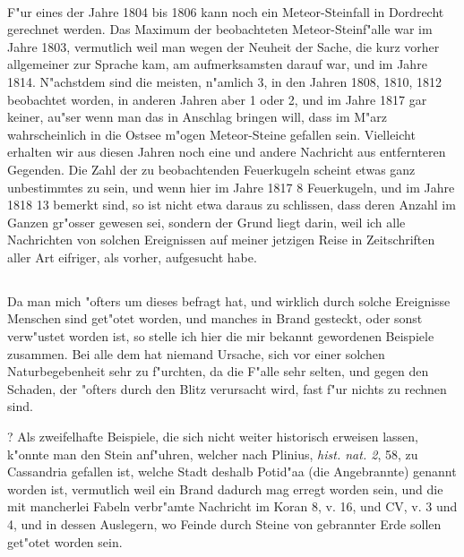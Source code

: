 \documentclass[a4paper, 11pt, oneside, polutonikogreek, german]{article}
\begin{document}
\paragraph{}
F"ur eines der Jahre 1804 bis 1806 kann noch ein Meteor-Steinfall in Dordrecht gerechnet werden. Das Maximum der beobachteten Meteor-Steinf"alle war im Jahre 1803, vermutlich weil man wegen der Neuheit der Sache, die kurz vorher allgemeiner zur Sprache kam, am aufmerksamsten darauf war, und im Jahre 1814. N"achstdem sind die meisten, n"amlich 3, in den Jahren 1808, 1810, 1812 beobachtet worden, in anderen Jahren aber 1 oder 2, und im Jahre 1817 gar keiner, au"ser wenn man das in Anschlag bringen will, dass im M"arz wahrscheinlich in die Ostsee m"ogen Meteor-Steine gefallen sein. Vielleicht erhalten wir aus diesen Jahren noch eine und andere Nachricht aus entfernteren Gegenden. Die Zahl der zu beobachtenden Feuerkugeln scheint etwas ganz unbestimmtes zu sein, und wenn hier im Jahre 1817 8 Feuerkugeln, und im Jahre 1818 13 bemerkt sind, so ist nicht etwa daraus zu schlissen, dass deren Anzahl im Ganzen gr"osser gewesen sei, sondern der Grund liegt darin, weil ich alle Nachrichten von solchen Ereignissen auf meiner jetzigen Reise in Zeitschriften aller Art eifriger, als vorher, aufgesucht habe.
\subsection{}
\paragraph{}
Da man mich "ofters um dieses befragt hat, und wirklich durch solche Ereignisse Menschen sind get"otet worden, und manches in Brand gesteckt, oder sonst verw"ustet worden ist, so stelle ich hier die mir bekannt gewordenen Beispiele zusammen. Bei alle dem hat niemand Ursache, sich vor einer solchen Naturbegebenheit sehr zu f"urchten, da die F"alle sehr selten, und gegen den Schaden, der "ofters durch den Blitz verursacht wird, fast f"ur nichts zu rechnen sind.

? Als zweifelhafte Beispiele, die sich nicht weiter historisch erweisen lassen, k"onnte man den Stein anf"uhren, welcher nach Plinius, \emph{hist. nat. 2}, 58, zu Cassandria gefallen ist, welche Stadt deshalb Potid"aa (die Angebrannte) genannt worden ist, vermutlich weil ein Brand dadurch mag erregt worden sein, und die mit mancherlei Fabeln verbr"amte Nachricht im Koran 8, v. 16, und CV, v. 3 und 4, und in dessen Auslegern, wo Feinde durch Steine von gebrannter Erde sollen get"otet worden sein.
\end{document}
